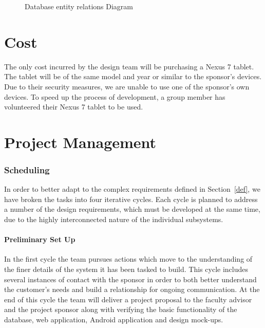 \documentclass[Letter,11pt]{article}
\begin{document}
		\begin{figure}[h]
			\centering
			
			\caption{\label{ERdiogram} Database entity relations Diagram}
		\end{figure}
	

		
	
\part{Cost}
The only cost incurred by the design team will be purchasing a Nexus 7 tablet. The tablet will be of the same model and year or similar to the sponsor's devices.  Due to their security measures, we are unable to use one of the sponsor's own devices. To speed up the process of development, a group member has volunteered their Nexus 7 tablet to be used.
\part{Project Management}
\section{Scheduling}
		In order to better adapt to the complex requirements defined in Section~\ref{def}, we have broken the tasks into four iterative cycles. Each cycle is planned to address a number of the design requirements, which must be developed at the same time, due to the highly interconnected nature of the individual subsystems. 
		
		
	\subsection{Preliminary Set Up}\label{cyc1}
		In the first cycle the team pursues actions which move to the understanding of the finer details of the system it has been tasked to build. This cycle includes several instances of contact with the sponsor in order to both better understand the customer's needs and build a relationship for ongoing communication. At the end of this cycle the team will deliver a project proposal to the faculty advisor and the project sponsor along with verifying the basic functionality of the database, web application, Android application and design mock-ups. 
		
\end{document}
